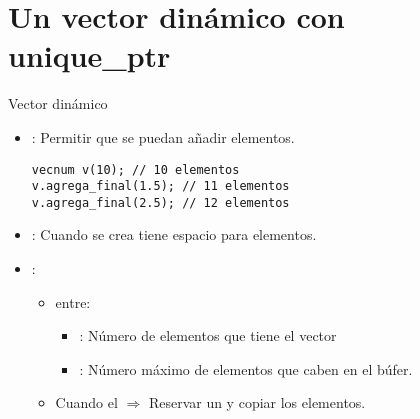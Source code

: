 \section{Un vector dinámico con \textbf{unique\_ptr}}

\begin{frame}[t,fragile]{Vector dinámico}
\begin{itemize}
  \item {}: Permitir que se puedan añadir elementos.
\begin{lstlisting}
vecnum v(10); // 10 elementos
v.agrega_final(1.5); // 11 elementos
v.agrega_final(2.5); // 12 elementos
\end{lstlisting}

  \item {}: Cuando  se crea tiene espacio para  elementos.

  \item {}:
    \begin{itemize}
      \item {} entre:
        \begin{itemize}
          \item {}: Número de elementos que tiene el vector
          \item {}: Número máximo de elementos que caben en el búfer.
        \end{itemize}
      \item Cuando el  $\Rightarrow$
            Reservar un  y copiar los elementos.
    \end{itemize}
\end{itemize}
\end{frame}

